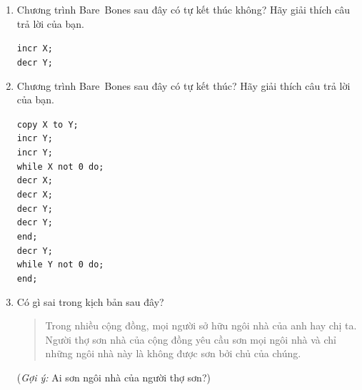 \begin{enumerate}
\item Chương trình Bare~Bones sau đây có tự kết thúc không? Hãy giải thích câu trả lời của
  bạn.
  \begin{flushleft}
    \qquad\qquad \texttt{incr X;} \\
    \qquad\qquad\texttt{decr Y;}
  \end{flushleft}

\item Chương trình Bare~Bones sau đây có tự kết thúc? Hãy giải thích câu trả lời của bạn.

  \begin{flushleft}
    \qquad \qquad \texttt{copy X to Y;} \\
    \qquad \qquad \texttt{incr Y;} \\
    \qquad\qquad\texttt{incr Y;} \\
    \qquad\qquad\texttt{while X not 0 do;} \\
    \qquad\qquad \qquad\texttt{decr X;} \\
    \qquad\qquad \qquad\texttt{decr X;} \\
    \qquad\qquad \qquad\texttt{decr Y;} \\
    \qquad\qquad \qquad\texttt{decr Y;} \\
    \qquad\qquad\texttt{end;} \\
    \qquad\qquad\texttt{decr Y;} \\
    \qquad\qquad\texttt{while Y not 0 do;} \\
    \qquad\qquad\texttt{end;}
  \end{flushleft} 


\item Có gì sai trong kịch bản sau đây?
  \begin{quote}
    Trong nhiều cộng đồng, mọi người sở hữu ngôi nhà của anh hay chị ta. Người thợ sơn
    nhà của cộng đồng yêu cầu sơn mọi ngôi nhà và chỉ những ngôi nhà này là không
    được sơn bởi chủ của chúng.
  \end{quote}
  (\textit{Gợi ý:} Ai sơn ngôi nhà của người thợ sơn?)
\end{enumerate}

